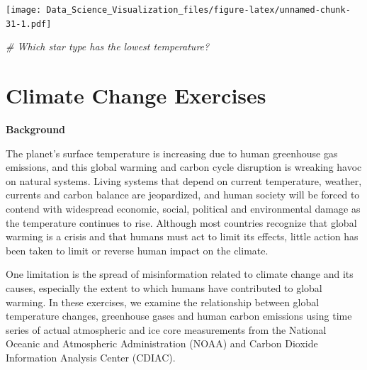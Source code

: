 \documentclass[
]{article}
\newenvironment{Shaded}{\begin{snugshade}}{\end{snugshade}}
\newcommand{\CommentTok}[1]{\textcolor[rgb]{0.56,0.35,0.01}{\textit{#1}}}
\newcommand{\DataTypeTok}[1]{\textcolor[rgb]{0.13,0.29,0.53}{#1}}
\newcommand{\KeywordTok}[1]{\textcolor[rgb]{0.13,0.29,0.53}{\textbf{#1}}}
\newcommand{\NormalTok}[1]{#1}
\newcommand{\OperatorTok}[1]{\textcolor[rgb]{0.81,0.36,0.00}{\textbf{#1}}}
\newcommand{\StringTok}[1]{\textcolor[rgb]{0.31,0.60,0.02}{#1}}
\begin{document}
\begin{Shaded}
\end{Shaded}

\texttt{[image: Data\_Science\_Visualization\_files/figure-latex/unnamed-chunk-31-1.pdf]}

\begin{Shaded}
\begin{Highlighting}[]
\CommentTok{# Which star type has the lowest temperature?}
\end{Highlighting}
\end{Shaded}

\hypertarget{climate-change-exercises}{%
\section{Climate Change Exercises}\label{climate-change-exercises}}

\textbf{Background}

The planet's surface temperature is increasing due to human greenhouse
gas emissions, and this global warming and carbon cycle disruption is
wreaking havoc on natural systems. Living systems that depend on current
temperature, weather, currents and carbon balance are jeopardized, and
human society will be forced to contend with widespread economic,
social, political and environmental damage as the temperature continues
to rise. Although most countries recognize that global warming is a
crisis and that humans must act to limit its effects, little action has
been taken to limit or reverse human impact on the climate.

One limitation is the spread of misinformation related to climate change
and its causes, especially the extent to which humans have contributed
to global warming. In these exercises, we examine the relationship
between global temperature changes, greenhouse gases and human carbon
emissions using time series of actual atmospheric and ice core
measurements from the National Oceanic and Atmospheric Administration
(NOAA) and Carbon Dioxide Information Analysis Center (CDIAC).
\end{document}
